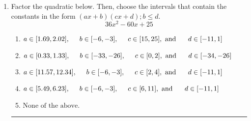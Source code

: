 \documentclass[14pt]{extbook}
\newcommand{\litem}[1]{\item#1\hspace*{-1cm}\rule{\textwidth}{0.4pt}}
\begin{document}
\begin{enumerate}
{\begin{enumerate}[label=\Alph*.]
\end{enumerate} }
\litem{
Factor the quadratic below. Then, choose the intervals that contain the constants in the form $(ax+b)(cx+d); b \leq d.$\[ 36x^{2} -60 x + 25 \]\begin{enumerate}[label=\Alph*.]
\item \( a \in [1.69, 2.02], \hspace*{5mm} b \in [-6, -3], \hspace*{5mm} c \in [15, 25], \text{ and } \hspace*{5mm} d \in [-11, 1] \)
\item \( a \in [0.33, 1.33], \hspace*{5mm} b \in [-33, -26], \hspace*{5mm} c \in [0, 2], \text{ and } \hspace*{5mm} d \in [-34, -26] \)
\item \( a \in [11.57, 12.34], \hspace*{5mm} b \in [-6, -3], \hspace*{5mm} c \in [2, 4], \text{ and } \hspace*{5mm} d \in [-11, 1] \)
\item \( a \in [5.49, 6.23], \hspace*{5mm} b \in [-6, -3], \hspace*{5mm} c \in [6, 11], \text{ and } \hspace*{5mm} d \in [-11, 1] \)
\item \( \text{None of the above.} \)

\end{enumerate} }
\end{enumerate}
\end{document}
